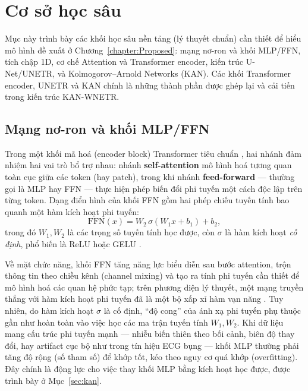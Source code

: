 \documentclass[../DoAn.tex]{subfiles}
\begin{document}
\section{Cơ sở học sâu}
\label{sec:dl_background}

Mục này trình bày các khối học sâu nền tảng (lý thuyết chuẩn) cần thiết để hiểu mô hình đề xuất ở Chương~\ref{chapter:Proposed}: mạng nơ-ron và khối MLP/FFN, tích chập 1D, cơ chế Attention và Transformer encoder, kiến trúc U-Net/UNETR, và Kolmogorov--Arnold Networks (KAN). Các khối Transformer encoder, UNETR và KAN chính là những thành phần được ghép lại và cải tiến trong kiến trúc KAN-WNETR.

\subsection{Mạng nơ-ron và khối MLP/FFN}

Trong một khối mã hoá (encoder block) Transformer tiêu chuẩn \cite{vaswaniAttentionAllYou2023},
hai nhánh đảm nhiệm hai vai trò bổ trợ nhau: nhánh \textbf{self-attention} mô hình hoá
tương quan toàn cục giữa các token (hay patch), trong khi nhánh \textbf{feed-forward}
--- thường gọi là MLP hay FFN --- thực hiện phép biến đổi phi tuyến một cách độc lập
trên từng token. Dạng điển hình của khối FFN gồm hai phép chiếu tuyến tính bao quanh
một hàm kích hoạt phi tuyến:
\begin{equation}
  \mathrm{FFN}(x)=W_2\,\sigma(W_1x+b_1)+b_2,
\end{equation}
trong đó $W_1,W_2$ là các trọng số tuyến tính học được, còn $\sigma$ là hàm kích hoạt
\emph{cố định}, phổ biến là ReLU \cite{nairRectifiedLinearUnits2010} hoặc GELU \cite{hendrycksGaussianErrorLinear2023}.

Về mặt chức năng, khối FFN tăng năng lực biểu diễn sau bước attention, trộn thông tin
theo chiều kênh (channel mixing) và tạo ra tính phi tuyến cần thiết để mô hình hoá các
quan hệ phức tạp; trên phương diện lý thuyết, một mạng truyền thẳng với hàm kích hoạt
phi tuyến đã là một bộ xấp xỉ hàm vạn năng \cite{hornikMultilayerFeedforwardNetworks1989}. Tuy nhiên, do
hàm kích hoạt $\sigma$ là cố định, ``độ cong'' của ánh xạ phi tuyến phụ thuộc gần như
hoàn toàn vào việc học các ma trận tuyến tính $W_1,W_2$. Khi dữ liệu mang cấu trúc phi
tuyến mạnh --- nhiễu biến thiên theo bối cảnh, biên độ thay đổi, hay artifact cục bộ như
trong tín hiệu ECG bụng --- khối MLP thường phải tăng độ rộng (số tham số) để khớp tốt,
kéo theo nguy cơ quá khớp (overfitting). Đây chính là động lực cho việc thay khối MLP
bằng kích hoạt học được, được trình bày ở Mục~\ref{sec:kan}.
\end{document}
